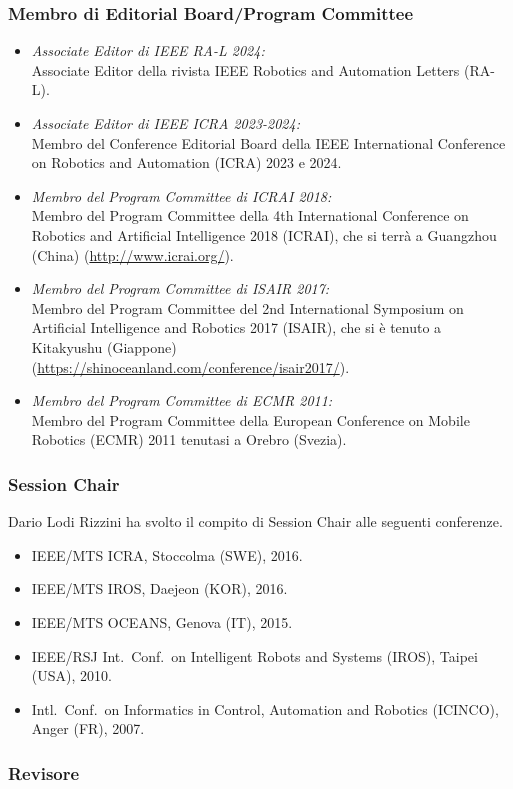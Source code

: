 \documentclass[11pt]{article}
\newcommand{\ITEMDATE}[1]{\item \textit{#1:}\\}
\begin{document}
\subsubsection*{Membro di Editorial Board/Program Committee}

\begin{itemize}
\ITEMDATE{Associate Editor di IEEE RA-L 2024}
Associate Editor della rivista IEEE Robotics and Automation Letters (RA-L). 
\ITEMDATE{Associate Editor di IEEE ICRA 2023-2024}
Membro del Conference Editorial Board della IEEE International Conference on Robotics and Automation (ICRA) 2023 e 2024.
\ITEMDATE{Membro del Program Committee di ICRAI 2018}
Membro del Program Committee della 4th International Conference on Robotics and Artificial Intelligence 2018 (ICRAI),  
che si terr\`a a Guangzhou (China) ({\footnotesize \url{http://www.icrai.org/}}). 
\ITEMDATE{Membro del Program Committee di ISAIR 2017}
Membro del Program Committee del 2nd International Symposium on Artificial Intelligence and Robotics 2017 (ISAIR),  
che si \`e tenuto a Kitakyushu (Giappone) \\
({\footnotesize \url{https://shinoceanland.com/conference/isair2017/}}). 
\ITEMDATE{Membro del Program Committee di ECMR 2011}
Membro del Program Committee della European Conference on Mobile Robotics (ECMR) 2011
tenutasi a Orebro (Svezia). 
\end{itemize}


\subsubsection*{Session Chair}

Dario Lodi Rizzini ha svolto il compito di Session Chair alle seguenti conferenze.
\begin{itemize}
\item IEEE/MTS ICRA, Stoccolma (SWE), 2016. 
\item IEEE/MTS IROS, Daejeon (KOR), 2016. 
\item IEEE/MTS OCEANS, Genova (IT), 2015. 
\item IEEE/RSJ Int.~Conf.~on Intelligent Robots and Systems (IROS), Taipei (USA), 2010.
\item Intl.~Conf.~on Informatics in Control, Automation and Robotics (ICINCO), Anger (FR), 2007.
\end{itemize}


\subsubsection*{Revisore}
\end{document}

